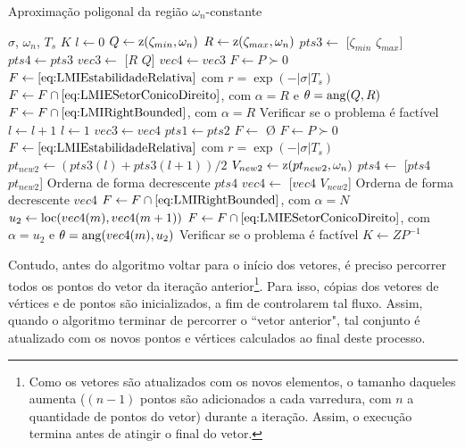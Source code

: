 \begin{algorithm}[!ht]
  \caption{Aproximação poligonal da região $\omega_n$-constante}\label{alg:AproximacaoPoligonalWn}
  \begin{algorithmic}[1]
    \Require $\sigma$, $\omega_n$, $T_s$
    \Ensure $K$
    \State $l \gets 0$
    \State $Q \gets \operatorname{\mathrm{z}}(\zeta_{min},\omega_n)$
    \State $R \gets \operatorname{\mathrm{z}}(\zeta_{max},\omega_n)$
    \State $pts3 \gets$ [$\zeta_{min}$ $\zeta_{max}$]
    \State $pts4 \gets pts3$
    \State $vec3 \gets$ [$R$ $Q$]
    \State $vec4 \gets vec3$
    \State $F \gets P \succ 0$
    \State $F \gets \eqref{eq:LMIEstabilidadeRelativa}$ com $r = \exp{\left(-|\sigma|T_s\right)}$ 
    \State $F \gets F \cap \eqref{eq:LMIESetorConicoDireito}$, com $\alpha = R$ e $\theta = \operatorname{ang}(Q,R)$ 
    \State $F \gets F \cap \eqref{eq:LMIRightBounded}$, com $\alpha = R$ 
    \State Verificar se o problema é factível
        \State $l \gets l + 1$
      \Else
        \State $l \gets 1$
        \State $vec3 \gets vec4$
        \State $pts1 \gets pts2$
      \EndIf
        \State $F \gets$ \O {}
        \State $F \gets P \succ 0$
        \State $F \gets \eqref{eq:LMIEstabilidadeRelativa}$ com $r = \exp{\left(-|\sigma|T_s\right)}$ 
        \State $pt_{new2} \gets (pts3(l)+pts3(l+1))/2$
        \State $V_{new2} \gets \operatorname{\mathrm{z}}(pt_{new2}, \omega_n)$
        \State $pts4 \gets$ [$pts4$ $pt_{new2}$]
        \State Orderna de forma decrescente $pts4$
        \State $vec4 \gets$ [$vec4$ $V_{new2}$]
        \State Orderna de forma decrescente $vec4$
        \State $F \gets F \cap \eqref{eq:LMIRightBounded}$, com $\alpha = N$ 
          \State $u_2 \gets \operatorname{loc}(vec4(m),vec4(m+1))$
          \State $F \gets F \cap \eqref{eq:LMIESetorConicoDireito}$, com $\alpha = u_2$ e $\theta = \operatorname{ang}(vec4(m),u_2)$
        \EndFor
        \State Verificar se o problema é factível
    \EndWhile
    \State $K \gets ZP^{-1}$
  \end{algorithmic}
\end{algorithm}

Contudo, antes do algoritmo voltar para o início dos vetores, é preciso percorrer todos os pontos do vetor da iteração anterior\footnote{Como os vetores são atualizados com os novos elementos, o tamanho daqueles aumenta ($(n-1)$ pontos são adicionados a cada varredura, com $n$ a quantidade de pontos do vetor) durante a iteração. Assim, o execução termina antes de atingir o final do vetor.}. Para isso, cópias dos vetores de vértices e de pontos são inicializados, a fim de controlarem tal fluxo. Assim, quando o algoritmo terminar de percorrer o ``vetor anterior", tal conjunto é atualizado com os novos pontos e vértices calculados ao final deste processo.

